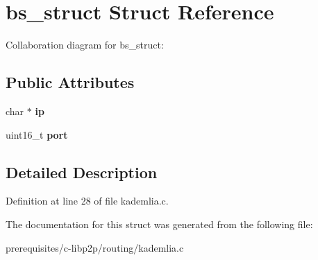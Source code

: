 \hypertarget{structbs__struct}{}\section{bs\+\_\+struct Struct Reference}
\label{structbs__struct}


Collaboration diagram for bs\+\_\+struct\+:
\subsection*{Public Attributes}
\begin{DoxyCompactItemize}
\item 
\mbox{\label{structbs__struct_a2e04a96f9c3937c369f9d074d9f8f166}} 
char $\ast$ {\bfseries ip}
\item 
\mbox{\label{structbs__struct_a993502e77246bd40f37d9b5edd20e961}} 
uint16\+\_\+t {\bfseries port}
\end{DoxyCompactItemize}


\subsection{Detailed Description}


Definition at line 28 of file kademlia.\+c.



The documentation for this struct was generated from the following file\+:\begin{DoxyCompactItemize}
\item 
prerequisites/c-\/libp2p/routing/kademlia.\+c\end{DoxyCompactItemize}
